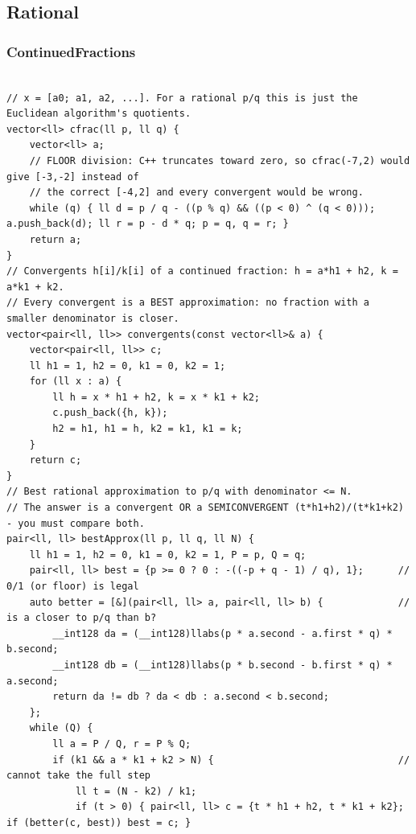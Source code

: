 \documentclass[9pt,a4paper,twocolumn]{extarticle}
\begin{document}
\subsection{Rational}

\filbreak
\subsubsection{ContinuedFractions}
\nopagebreak
\begin{lstlisting}

// x = [a0; a1, a2, ...]. For a rational p/q this is just the Euclidean algorithm's quotients.
vector<ll> cfrac(ll p, ll q) {
    vector<ll> a;
    // FLOOR division: C++ truncates toward zero, so cfrac(-7,2) would give [-3,-2] instead of
    // the correct [-4,2] and every convergent would be wrong.
    while (q) { ll d = p / q - ((p % q) && ((p < 0) ^ (q < 0))); a.push_back(d); ll r = p - d * q; p = q, q = r; }
    return a;
}
// Convergents h[i]/k[i] of a continued fraction: h = a*h1 + h2, k = a*k1 + k2.
// Every convergent is a BEST approximation: no fraction with a smaller denominator is closer.
vector<pair<ll, ll>> convergents(const vector<ll>& a) {
    vector<pair<ll, ll>> c;
    ll h1 = 1, h2 = 0, k1 = 0, k2 = 1;
    for (ll x : a) {
        ll h = x * h1 + h2, k = x * k1 + k2;
        c.push_back({h, k});
        h2 = h1, h1 = h, k2 = k1, k1 = k;
    }
    return c;
}
// Best rational approximation to p/q with denominator <= N.
// The answer is a convergent OR a SEMICONVERGENT (t*h1+h2)/(t*k1+k2) - you must compare both.
pair<ll, ll> bestApprox(ll p, ll q, ll N) {
    ll h1 = 1, h2 = 0, k1 = 0, k2 = 1, P = p, Q = q;
    pair<ll, ll> best = {p >= 0 ? 0 : -((-p + q - 1) / q), 1};      // 0/1 (or floor) is legal
    auto better = [&](pair<ll, ll> a, pair<ll, ll> b) {             // is a closer to p/q than b?
        __int128 da = (__int128)llabs(p * a.second - a.first * q) * b.second;
        __int128 db = (__int128)llabs(p * b.second - b.first * q) * a.second;
        return da != db ? da < db : a.second < b.second;
    };
    while (Q) {
        ll a = P / Q, r = P % Q;
        if (k1 && a * k1 + k2 > N) {                                // cannot take the full step
            ll t = (N - k2) / k1;
            if (t > 0) { pair<ll, ll> c = {t * h1 + h2, t * k1 + k2}; if (better(c, best)) best = c; }

\end{lstlisting}
\end{document}
